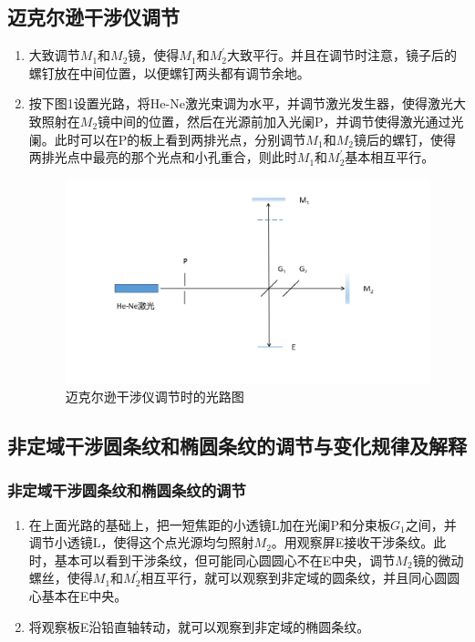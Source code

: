 \documentclass[a4paper,11pt]{article}
\begin{document}
\subsection{迈克尔逊干涉仪调节}
\begin{enumerate}
	\item 大致调节$M_{1}$和$M_{2}$镜，使得$M_{1}$和$M_{2}^{\prime}$大致平行。并且在调节时注意，镜子后的螺钉放在中间位置，以便螺钉两头都有调节余地。
	\item 按下图1设置光路，将He-Ne激光束调为水平，并调节激光发生器，使得激光大致照射在$M_{2}$镜中间的位置，然后在光源前加入光阑P，并调节使得激光通过光阑。此时可以在P的板上看到两排光点，分别调节$M_{1}$和$M_{2}$镜后的螺钉，使得两排光点中最亮的那个光点和小孔重合，则此时$M_{1}$和$M_{2}^{\prime}$基本相互平行。
	\begin{figure}[H]
		\centering
		\includegraphics[width=.8\linewidth]{图片1.png}
		\caption{ 迈克尔逊干涉仪调节时的光路图}
	\end{figure}\noindent%
\end{enumerate}


\subsection{非定域干涉圆条纹和椭圆条纹的调节与变化规律及解释}
\subsubsection{非定域干涉圆条纹和椭圆条纹的调节}
\begin{enumerate}
	\item 在上面光路的基础上，把一短焦距的小透镜L加在光阑P和分束板$G_{1}$之间，并调节小透镜L，使得这个点光源均匀照射$M_{2}$。用观察屏E接收干涉条纹。此时，基本可以看到干涉条纹，但可能同心圆圆心不在E中央，调节$M_{2}$镜的微动螺丝，使得$M_{1}$和$M_{2}^{\prime}$相互平行，就可以观察到非定域的圆条纹，并且同心圆圆心基本在E中央。
	\item 将观察板E沿铅直轴转动，就可以观察到非定域的椭圆条纹。
\end{enumerate}
\end{document}
